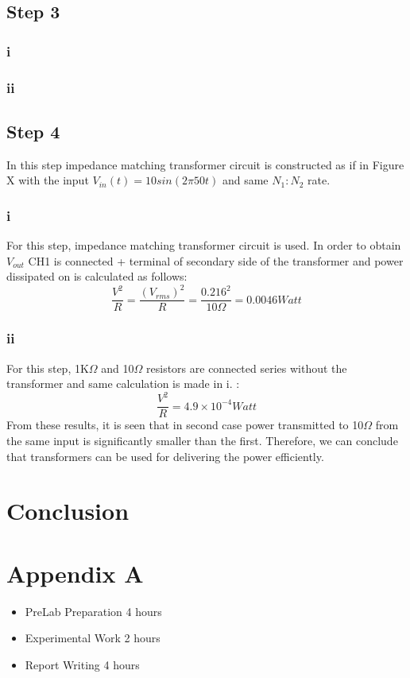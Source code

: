 \documentclass[letterpaper,12pt]{article}
\begin{document}
\subsection{Step 3}

\subsubsection{i}
\subsubsection{ii}

%
\subsection{Step 4}
In this step impedance matching transformer circuit is constructed as if in Figure X with the input \(V_{in}(t) = 10sin(2\pi50t)\) and same \(N_1:N_2\) rate. 

\subsubsection{i}
For this step, impedance matching transformer circuit is used. In order to obtain \(V_{out}\) CH1 is connected + terminal of secondary side of the transformer and power dissipated on is calculated as follows:
\[\frac{V^2}{R} = \frac{(V_{rms})^2}{R} = \frac{0.216^2}{10\Omega } = 0.0046 Watt\]   

\subsubsection{ii}
For this step, 1K\(\Omega \) and 10\(\Omega \) resistors are connected series without the transformer and same calculation is made in i. :
\[\frac{V^2}{R} = 4.9 \times 10^{-4} Watt\]
 From these results, it is seen that in second case power transmitted to 10\(\Omega \) from the same input is significantly smaller than the first. Therefore, we can conclude that transformers can be used for delivering the power efficiently. 

\section{Conclusion}

\section*{Appendix A}
\begin{itemize}
    \item PreLab Preparation 4 hours
    \item Experimental Work 2  hours
    \item Report Writing 4 hours
\end{itemize}
\end{document}
